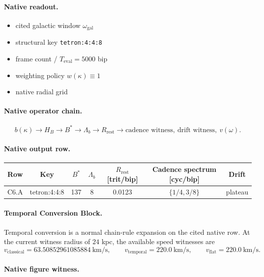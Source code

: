 \paragraph{Native readout.}
\begin{itemize}
\item cited galactic window $\omega_{\mathrm{gal}}$
\item structural key \texttt{tetron:4:4:8}
\item frame count / $T_{\mathrm{eval}}=5000$ bip
\item weighting policy $w(\kappa)\equiv 1$
\item native radial grid
\end{itemize}
\paragraph{Native operator chain.}
\[
b(\kappa)\to H_B\to B^*\to \Lambda_b\to R_{\mathrm{rest}}\to \text{cadence witness},\ \text{drift witness},\ v(\omega).
\]
\paragraph{Native output row.}
\begin{center}
\small
\begin{tabular}{lcccccc}
\toprule
Row & Key & $B^*$ & $\Lambda_b$ & $R_{\mathrm{rest}}$ [trit/bip] & Cadence spectrum [cyc/bip] & Drift \\
\midrule
C6.A & tetron:4:4:8 & 137 & 8 & 0.0123 & $\{1/4,3/8\}$ & plateau \\
\bottomrule
\end{tabular}
\end{center}
\paragraph{Temporal Conversion Block.} Temporal conversion is a normal chain-rule expansion on the cited native row. At the current witness radius of $24$ kpc, the available speed witnesses are
\[
v_{\mathrm{classical}}=63.50852961085884\ \text{km/s},\qquad
v_{\mathrm{temporal}}=220.0\ \text{km/s},\qquad
v_{\mathrm{flat}}=220.0\ \text{km/s}.
\]
\paragraph{Native figure witness.}
\begin{center}
\end{center}
